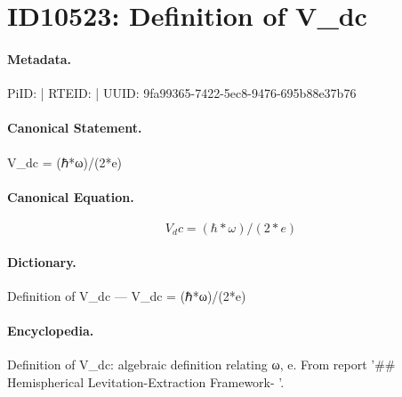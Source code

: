 \section*{ID10523: Definition of V\_dc}
\paragraph{Metadata.}
PiID:  | RTEID:  | UUID: 9fa99365-7422-5ec8-9476-695b88e37b76

\paragraph{Canonical Statement.}
V\_dc = (ℏ*ω)/(2*e)

\paragraph{Canonical Equation.}
\[
V_dc = (ℏ*ω)/(2*e)
\]

\paragraph{Dictionary.}
Definition of V\_dc — V\_dc = (ℏ*ω)/(2*e)

\paragraph{Encyclopedia.}
Definition of V\_dc: algebraic definition relating ω, e. From report '\#\# Hemispherical Levitation-Extraction Framework- '.

